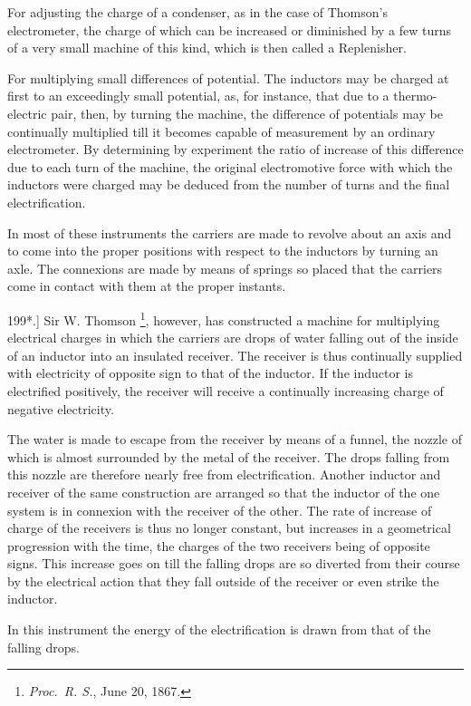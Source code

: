 \documentclass[12pt,oneside]{book}[2021/10/04]
\let\oldfootnote\footnote
\renewcommand\footnote[1]{%
\oldfootnote{\hspace{0.14em}#1}}
\newcommand{\Runhead}[1]{\fancyhead[C]{\iffloatpage{}{\small#1}}}
\newcommand{\article}[1]{\phantomsection \label{art:#1}{#1.]}}
\newcommand{\¬}{\hphantom{0}}
\begin{document}
For adjusting the charge of a condenser, as in the case of
Thomson's electrometer, the charge of which can be increased or
diminished by a few turns of a very small machine of this kind,
which is then called a Replenisher.

For multiplying small differences of potential. The inductors
may be charged at first to an exceedingly small potential, as, for
instance, that due to a thermo-electric pair, then, by turning the
machine, the difference of potentials may be continually multiplied
till it becomes capable of measurement by an ordinary electrometer.
By determining by experiment the ratio of increase of this difference
due to each turn of the machine, the original electromotive force
with which the inductors were charged may be deduced from the
number of turns and the final electrification.

In most of these instruments the carriers are made to revolve
about an axis and to come into the proper positions with respect
to the inductors by turning an axle. The connexions are made by
means of springs so placed that the carriers come in contact with
them at the proper instants.

\article{199*} Sir W. Thomson\footnote{
\textit{Proc.\ R. S.}, June 20, 1867.}, however, has constructed a machine
for multiplying electrical charges in which the carriers are drops of
water falling out of the inside of an inductor into an insulated
receiver. The receiver is thus continually supplied with electricity
of opposite sign to that of the inductor. If the inductor is electrified
positively, the receiver will receive a continually increasing charge
of negative electricity.
\Runhead{WATER DROPPING ACCUMULATOR.}

The water is made to escape from the receiver by means of a
funnel, the nozzle of which is almost surrounded by the metal of
the receiver. The drops falling from this nozzle are therefore
nearly free from electrification. Another inductor and receiver of
the same construction are arranged so that the inductor of the
one system is in connexion with the receiver of the other. The
rate of increase of charge of the receivers is thus no longer constant,
but increases in a geometrical progression with the time, the
charges of the two receivers being of opposite signs. This increase
goes on till the falling drops are so diverted from their course by
the electrical action that they fall outside of the receiver or even
strike the inductor.

In this instrument the energy of the electrification is drawn
from that of the falling drops.
\end{document}
